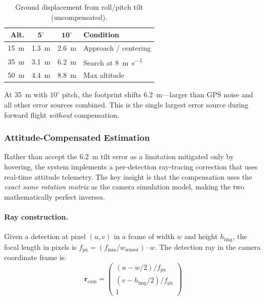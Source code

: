 \documentclass[10pt,a4paper]{article}
\begin{document}
\begin{table}[ht]
  \centering
  \caption{Ground displacement from roll/pitch tilt (uncompensated).}\label{tab:tilt-error}
  \begin{tabular}{@{}rccl@{}}
    \toprule
    \textbf{Alt.} & $\boldsymbol{5^{\circ}}$ & $\boldsymbol{10^{\circ}}$ & \textbf{Condition} \\
    \midrule
    \SI{15}{\metre} & \SI{1.3}{\metre} & \SI{2.6}{\metre} & Approach / centering \\
    \SI{35}{\metre} & \SI{3.1}{\metre} & \SI{6.2}{\metre} & Search at \SI{8}{\metre\per\second} \\
    \SI{50}{\metre} & \SI{4.4}{\metre} & \SI{8.8}{\metre} & Max altitude \\
    \bottomrule
  \end{tabular}
\end{table}

At \SI{35}{\metre} with $10^{\circ}$ pitch, the footprint shifts \SI{6.2}{\metre}---larger than GPS noise and all other error sources combined.  This is the single largest error source during forward flight \emph{without} compensation.

\subsubsection{Attitude-Compensated Estimation}\label{sec:cv:tilt-compensation}

Rather than accept the \SI{6.2}{\metre} tilt error as a limitation mitigated only by hovering, the system implements a per-detection ray-tracing correction that uses real-time attitude telemetry.  The key insight is that the compensation uses the \emph{exact same rotation matrix} as the camera simulation model, making the two mathematically perfect inverses.

\paragraph{Ray construction.}
Given a detection at pixel $(u, v)$ in a frame of width $w$ and height $h_\mathrm{img}$, the focal length in pixels is $f_\mathrm{px} = (f_\mathrm{mm} / w_\mathrm{sensor}) \cdot w$.  The detection ray in the camera coordinate frame is:
%
\begin{equation}\label{eq:cv-ray-cam}
  \mathbf{r}_\mathrm{cam} = \begin{pmatrix} (u - w/2) / f_\mathrm{px} \\ (v - h_\mathrm{img}/2) / f_\mathrm{px} \\ 1 \end{pmatrix}
\end{equation}
\end{document}
